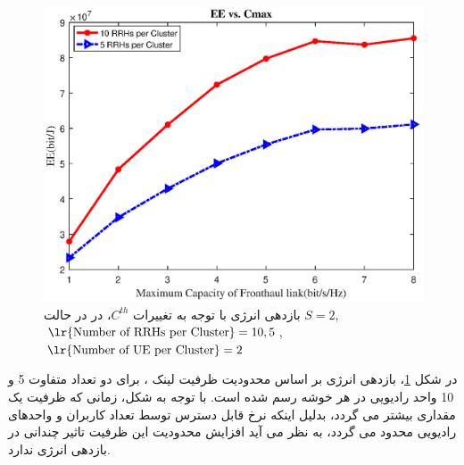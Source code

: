 %
%
\begin{figure}[H]
  \centering
    \includegraphics[width=\linewidth]{./fig3/cm}
  \caption{  بازدهی انرژی با توجه به تغییرات $C^{th}$، در در حالت $S =2$, $\text{\lr{Number of RRHs per Cluster}} = 10 , 5$, $\text{\lr{Number of UE per Cluster}} =2$ }
  \label{fig:nem3}
\end{figure}

در شکل \ref{fig:nem3}، بازدهی انرژی بر اساس محدودیت ظرفیت لینک ، برای دو تعداد متفاوت  5 و 10 واحد رادیویی در هر خوشه رسم شده است. با توجه به شکل، زمانی که ظرفیت یک مقداری بیشتر
 می گردد، بدلیل اینکه نرخ قابل دسترس توسط تعداد کاربران و واحدهای رادیویی محدود می گردد، به نظر می آید افزایش محدودیت این ظرفیت تاثیر چندانی در بازدهی انرژی ندارد.  

% 
 

